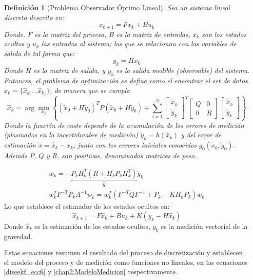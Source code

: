 \documentclass[conference]{IEEEtran}
\newtheorem {defin}{Definición}[section]
\begin{document}
\begin{defin}[Problema Observador Óptimo Lineal]\label{problemaobsoptlineal}
Sea un sistema lineal discreto descrito en:
\begin{equation}
\label{filtro_ecc3}
x_{k+1}=Fx_k+Bu_k
\end{equation} 
Donde, $F$ es la matriz del proceso, $B$ es la matriz de entradas, $x_k$ son los estados ocultos y $u_k$ las entradas al sistema; las que se relacionan con las variables de salida de tal forma que:
\begin{equation}
\label{filtro_ecc4}
y_{k}=Hx_k
\end{equation} 
Donde $H$ es la matriz de salida, y $y_k$ es la salida medible (observable) del sistema.
Entonces, el problema de optimización se define como el encontrar el set de datos $\hat{x}_k=\{\hat{x}_{k_0}...\hat{x}_{k_f}\}$, de manera que se cumpla $$\hat{x}_k=\arg\min_{x_k}\left\{(\tilde{x}_0+H\tilde{y}_0)^T
P(\tilde{x}_0+H\tilde{y}_0)+ \sum_{i=1}^{N} \begin{bmatrix}\tilde{x}_k\\\tilde{y}_k\end{bmatrix}^T
\begin{bmatrix}Q&0\\0&R\end{bmatrix} \begin{bmatrix}\tilde{x}_k\\\tilde{y}_k\end{bmatrix} \right\}$$
Donde la función de coste depende de la acumulación de los errores de medición (plasmados en la incertidumbre de medición) $\tilde{y}_k=h(\hat{x}_k)$ y del error de estimación $\tilde{x}=\hat{x}_k-x_k$; junto con los errores iniciales conocidos $g_0(\tilde{x}_k,\tilde{y}_0)$. Además $P$, $Q$ y $R$, son positivas, denominadas matrices de peso.
\end{defin}
\begin{gather}
w_{k}=-\underbrace{P_kH_k^T(R+H_kP_kH_k^T)}_K\tilde{y}_k\\
w_k^TF^{-T}P_kA^{-1}w_k=w_k^T(F^{-T}QF^{-1}+P_k-KH_kP_k)w_k
\end{gather}
Lo que establece el estimador de los estados ocultos en:
\begin{equation}\label{chap2:ObservadorLineal}
\hat{x}_{k+1}=F\hat{x}_k+Bu_{k}+K(y_k-H\hat{x}_k)
\end{equation}
Donde $\hat{x}_k$ es la estimación de los estados ocultos, $y_k$ es la medición vectorial de la gravedad. \par
Estas ecuaciones resumen el resultado del proceso de discretización y establecen el modelo del proceso y de medición como funciones no lineales, en las ecuaciones \eqref{diseekf_ecc6} y \eqref{chap2:ModeloMedicion} respectivamente.
\end{document}
